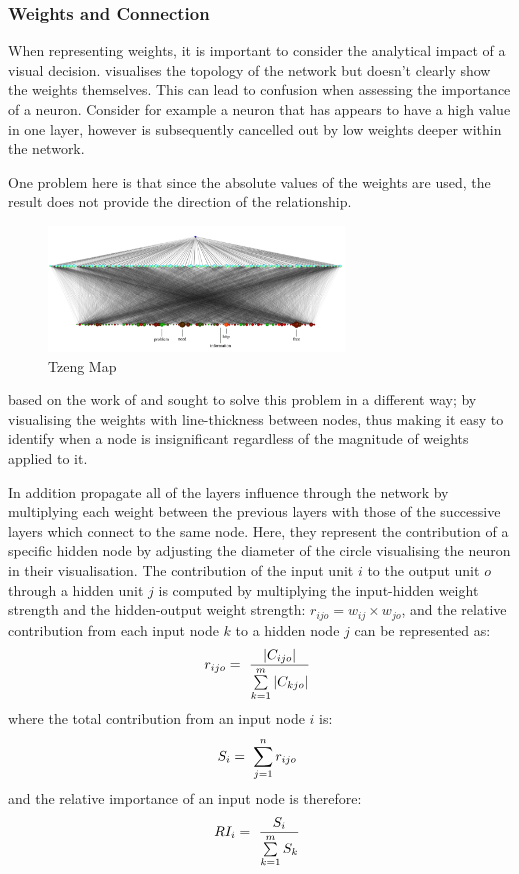 \documentclass[a4paper,11pt,titlepage]{article}
\begin{document}
		\subsubsection{Weights and Connection}
		When representing weights, it is important to consider the analytical impact of a visual decision. \cite{Streeter2001} visualises the topology of the network but doesn't clearly show the weights themselves. This can lead to confusion when assessing the importance of a neuron. Consider for example a neuron that has appears to have a high value in one layer, however is subsequently cancelled out by low weights deeper within the network.
	\par 
	One problem here is that since the absolute values of the weights are used, the result does not provide the direction of the relationship. 
	\par 
		
	\begin{figure}[H]
		\centering 
    		\includegraphics[width=0.7\textwidth]{img/tzeng_large_map.png} 
    		\caption{Tzeng Map}%
 	\end{figure}
 	
	\cite{Tzeng2005} based on the work of 	\cite{Garson1991} and \cite{Goh1995} sought to solve this problem in a different way; by visualising the weights with line-thickness between nodes, thus making it easy to identify when a node is insignificant regardless of the magnitude of weights applied to it.
	\par 
	In addition 	\cite{Tzeng2005} propagate all of the layers influence through the network by multiplying each weight between the previous layers with those of the successive layers which connect to the same node. Here, they represent the contribution of a specific hidden node by adjusting the diameter of the circle visualising the neuron in their visualisation. The contribution of the input unit $ i $ to the output unit $ o $ through a hidden unit $ j $ is computed by multiplying the input-hidden weight strength and the hidden-output weight strength:
$ r_{ijo} = w_{ij} \times w_{jo} $, and the relative contribution from each input node $ k $ to a hidden node $ j $ can be represented as:
		$$
		r_{ijo} = 
		\text{ $ \frac{|C_{ijo}|}{\sum\limits_{k=1}^m |C_{kjo}| } $ }
		$$ 
	where the total contribution from an input node $ i $ is: 
		$$
		S_{i} = 
		\text{ $ \sum\limits_{j=1}^n r_{ijo} $ }
		$$ 
	and the relative importance of an input node is therefore:
		$$
		RI_{i} = 
		\text{ $ \frac{S_{i}}{\sum\limits_{k=1}^m S_{k} } $ }
		$$ 
	 \par 
 		
\end{document}
